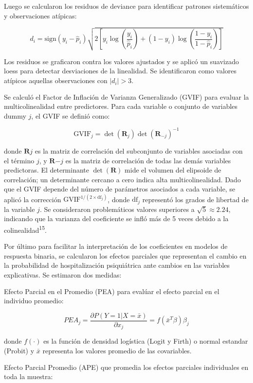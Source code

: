 \documentclass[
  spanish,
  10pt,
]{article}
\begin{document}
Luego se calcularon los residuos de deviance para identificar patrones
sistemáticos y observaciones atípicas:

\[d_i = \text{sign}(y_i - \hat{p}_i) \sqrt{2\left[y_i \log\left(\frac{y_i}{\hat{p}_i}\right) + (1-y_i)\log\left(\frac{1-y_i}{1-\hat{p}_i}\right)\right]}\]

Los residuos se graficaron contra los valores ajustados y se aplicó un
suavizado loess para detectar desviaciones de la linealidad. Se
identificaron como valores atípicos aquellas observaciones con
\(|d_i| > 3\).

Se calculó el Factor de Inflación de Varianza Generalizado (GVIF) para
evaluar la multicolinealidad entre predictores. Para cada variable o
conjunto de variables dummy \(j\), el GVIF se definió como:

\[\text{GVIF}_j = \det(\mathbf{R}_j)\det(\mathbf{R}_{-j})^{-1}\]

donde \(\mathbf{R}j\) es la matriz de correlación del subconjunto de
variables asociadas con el término \(j\), y \(\mathbf{R}{-j}\) es la
matriz de correlación de todas las demás variables predictoras. El
determinante \(\det(\mathbf{R})\) mide el volumen del elipsoide de
correlación; un determinante cercano a cero indica alta
multicolinealidad. Dado que el GVIF depende del número de parámetros
asociados a cada variable, se aplicó la corrección
\(\text{GVIF}^{1/(2 \times \text{df}_j)}\), donde \(\text{df}_j\)
representó los grados de libertad de la variable \(j\). Se consideraron
problemáticos valores superiores a \(\sqrt{5} \approx 2.24\), indicando
que la varianza del coeficiente se infló más de 5 veces debido a la
colinealidad\textsuperscript{15}.

Por último para facilitar la interpretación de los coeficientes en
modelos de respuesta binaria, se calcularon los efectos parciales que
representan el cambio en la probabilidad de hospitalización psiquiátrica
ante cambios en las variables explicativas. Se estimaron dos medidas:

Efecto Parcial en el Promedio (PEA) para evalúar el efecto parcial en el
individuo promedio:

\[PEA_j = \frac{\partial P(Y=1|X=\bar{x})}{\partial x_j} = f(\bar{x}^T\beta)\beta_j\]

donde \(f(\cdot)\) es la función de densidad logística (Logit y Firth) o
normal estandar (Probit) y \(\bar{x}\) representa los valores promedio
de las covariables.

Efecto Parcial Promedio (APE) que promedia los efectos parciales
individuales en toda la muestra:
\end{document}
